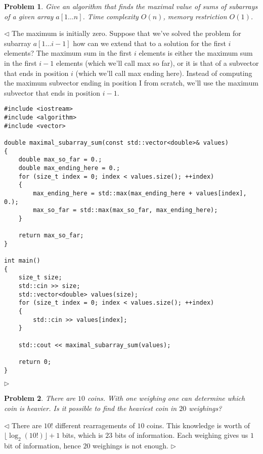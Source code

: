 \documentclass[12pt]{article}
\newtheorem{problem}{Problem}[subsection]
\newenvironment{solution}{\par $\triangleleft$}{$\triangleright$}
\begin{document}
\begin{problem} Give an algorithm that finds the maximal value of sums of
subarrays of a given array $a[1\ldots n]$.  Time complexity $O(n)$, memory
restriction $O(1)$.
\end{problem}
\begin{solution} The maximum is initially zero. Suppose that we've solved the
    problem for subarray $a[1\ldots i-1]$ how can we extend that to a solution
    for the first $i$ elements? The maximum sum in the first $i$ elements is
    either the maximum sum in the first $i-1$ elements (which we'll call max so
    far), or it is that of a subvector that ends in position $i$ (which we'll
    call max ending here). Instead of computing the maximum subvector ending in
    position I from scratch, we'll use the maximum subvector that ends in
    position $i-1$.
    \begin{verbatim}
#include <iostream>
#include <algorithm>
#include <vector>

double maximal_subarray_sum(const std::vector<double>& values)
{
    double max_so_far = 0.;
    double max_ending_here = 0.;
    for (size_t index = 0; index < values.size(); ++index)
    {
        max_ending_here = std::max(max_ending_here + values[index], 0.);
        max_so_far = std::max(max_so_far, max_ending_here);
    }

    return max_so_far;
}

int main()
{
    size_t size;
    std::cin >> size;
    std::vector<double> values(size);
    for (size_t index = 0; index < values.size(); ++index)
    {
        std::cin >> values[index];
    }

    std::cout << maximal_subarray_sum(values);

    return 0;
}
\end{verbatim}
\end{solution}

\begin{problem} There are $10$ coins. With one weighing one can determine which
coin is heavier. Is it possible to find the heaviest coin in $20$ weighings?
\end{problem}
\begin{solution} There are $10{!}$ different rearragements of $10$ coins. This
    knowledge is worth of $\lfloor\log_2(10!)\rfloor+1$ bits, which is $23$ bits
    of information. Each weighing gives us $1$ bit of information, hence $20$
    weighings is not enough.
\end{solution}
\end{document}
